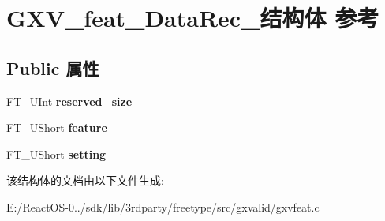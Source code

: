 \hypertarget{struct_g_x_v__feat___data_rec__}{}\section{G\+X\+V\+\_\+feat\+\_\+\+Data\+Rec\+\_\+结构体 参考}
\label{struct_g_x_v__feat___data_rec__}
\subsection*{Public 属性}
\begin{DoxyCompactItemize}
\item 
\mbox{\label{struct_g_x_v__feat___data_rec___a24f34b41b072ace68b9b216dd8b75303}} 
F\+T\+\_\+\+U\+Int {\bfseries reserved\+\_\+size}
\item 
\mbox{\label{struct_g_x_v__feat___data_rec___ae6e36ebe04e5672d57e1107023e13309}} 
F\+T\+\_\+\+U\+Short {\bfseries feature}
\item 
\mbox{\label{struct_g_x_v__feat___data_rec___afb79a6551af3a261d177dad82dcd57f1}} 
F\+T\+\_\+\+U\+Short {\bfseries setting}
\end{DoxyCompactItemize}


该结构体的文档由以下文件生成\+:\begin{DoxyCompactItemize}
\item 
E\+:/\+React\+O\+S-\/0../sdk/lib/3rdparty/freetype/src/gxvalid/gxvfeat.\+c\end{DoxyCompactItemize}
